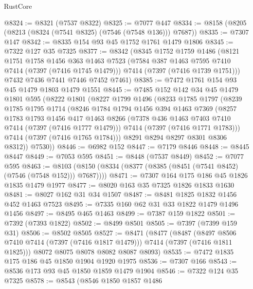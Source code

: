 \begin{lexlean}{RustCore}
\begin{coremodule}
@8324 := @8321 (@7537 @8322)
@8325 := @7077 @447
@8334 := @8158 (@8205 (@8213 (@8324 (@7541 @8325) (@7546 (@7548 @136))) @7687))
@8335 := @7307 @147
@8342 := @8335 @154 @93 @45 @1752 @1761 @1479 @1806
@8345 := @7322 @127 @35 @7325
@8377 := @8342
    (@8345
      @1752
      @1759
      @1486
      (@8121
        @1751
        @1758
        @1456
        @363
        @1463
        @7523
        (@7584 @387 @1463 @7595 @7410 @7414 (@7397 (@7416 @1745 @1479)))
        @7414
        (@7397 (@7416 @1739 @1751)))
      @7432
      @7436
      @7441
      @7446
      @7452
      @7461)
@8385 := @7472 @1761 @154 @93 @45 @1479 @1803 @1479 @1551
@8445 := @7485
    @152
    @142
    @34
    @45
    @1479
    @1801
    @595
    (@8222
      @1801
      (@8227
        @1799
        @1496
        (@8233
          @1785
          @1797
          (@8239
            @1785
            @1795
            @1714
            (@8246
              @1784
              @1794
              @1456
              @394
              @1463
              @7369
              (@8257
                @1783
                @1793
                @1456
                @417
                @1463
                @8266
                (@7378 @436 @1463 @7403 @7410 @7414 (@7397 (@7416 @1777 @1479)))
                @7414
                (@7397 (@7416 @1771 @1783)))
              @7414
              (@7397 (@7416 @1765 @1784)))
            @8291
            @8294
            @8297
            @8301
            @8306
            @8312))
        @7530))
@8446 := @6982 @152
@8447 := @7179 @8446
@8448 := @8445 @8447
@8449 := @7053 @595
@8451 := @8448 (@7537 @8449)
@8452 := @7077 @595
@8463 := @8103 (@8150 (@8334 (@8377 (@8385 (@8451 (@7541 @8452) (@7546 (@7548 @152))) @7687))))
@8471 := @7307 @164 @175 @186 @45 @1826 @1835 @1479 @1977
@8477 := @8020 @163 @35 @7325 @1826 @1833 @1630
@8481 := @8027 @162 @31 @34 @1507
@8487 := @8481 @1825 @1832 @1456 @452 @1463 @7523
@8495 := @7335 @160 @62 @31 @33 @1822 @1479 @1496 @1456
@8497 := @8495 @465 @1463
@8499 := @7387 @159 @1822
@8501 := @7392 (@7393 @1822)
@8502 := @8499 @8501
@8505 := @7397 (@7399 @159 @31)
@8506 := @8502 @8505
@8527 := @8471
    (@8477
      (@8487
        (@8497 @8506 @7410 @7414 (@7397 (@7416 @1817 @1479)))
        @7414
        (@7397 (@7416 @1811 @1825)))
      @8072
      @8075
      @8078
      @8082
      @8087
      @8093)
@8535 := @7472 @1835 @175 @186 @45 @1850 @1904 @1920 @1975
@8536 := @7307 @166
@8543 := @8536 @173 @93 @45 @1850 @1859 @1479 @1904
@8546 := @7322 @124 @35 @7325
@8578 := @8543
    (@8546
      @1850
      @1857
      @1486

\end{coremodule}
\end{lexlean}
